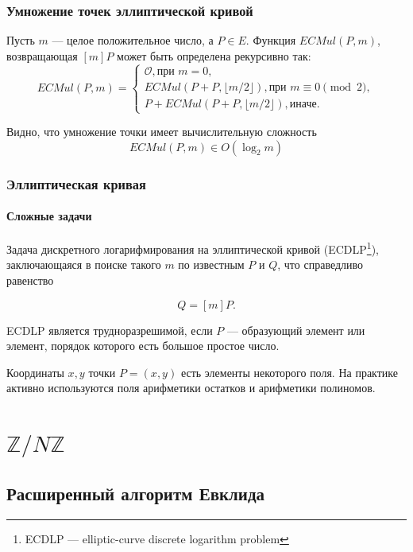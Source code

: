 \begin{frame}
    \frametitle{Умножение точек эллиптической кривой}

    Пусть $m$ --- целое \alert{положительное} число, а $P\in E$. Функция $ECMul(P,m)$, возвращающая $[m]P$ может быть определена рекурсивно так:
    \[
        ECMul(P, m) = 
        \begin{cases}
            \mathcal{O}, \text{при $m=0$},\\
            ECMul(P+P, \lfloor m/2 \rfloor),\text{при $m\equiv 0\pmod{2}$},\\
            P+ECMul(P+P, \lfloor m/2 \rfloor),\text{иначе}.
        \end{cases}
    \]
    
    Видно, что умножение точки имеет вычислительную сложность 
    \[
        ECMul(P,m)\in O(\log_2m)
    \]
\end{frame}


\begin{frame}
    \frametitle{Эллиптическая кривая}
    \framesubtitle{Сложные задачи}
    
    Задача \alert{дискретного логарифмирования на эллиптической кривой} (ECDLP\footnote{ECDLP --- elliptic-curve discrete logarithm problem}), заключающаяся в поиске такого $m$ по известным $P$ и $Q$, что справедливо равенство
    
    \[Q=[m]P.\]
    
    ECDLP является трудноразрешимой, если $P$ --- образующий элемент или элемент, порядок которого есть большое простое число.
    
    Координаты $x,y$ точки $P=(x,y)$ есть элементы некоторого поля. На практике активно используются поля арифметики остатков и арифметики полиномов.
\end{frame}


\appendix


\section{$\mathbb{Z}/N\mathbb{Z}$}


\subsection{Расширенный алгоритм Евклида}

